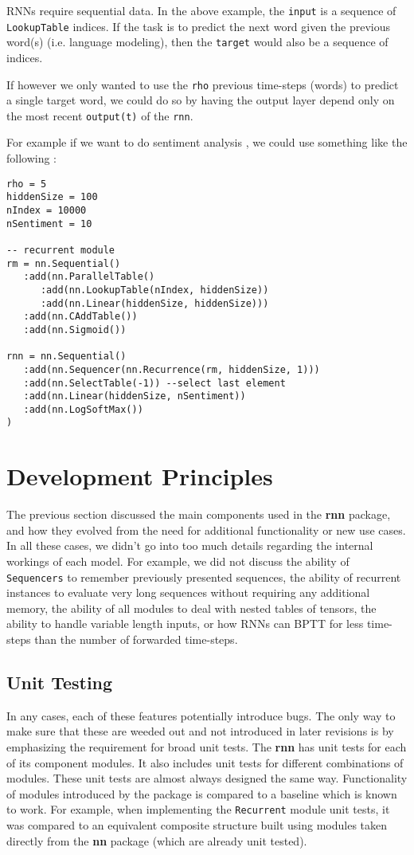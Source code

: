 \documentclass{article} %
\providecommand{\inlinecode}[1]{\texttt{#1}}
\begin{document}
RNNs require sequential data. In the above example, the \inlinecode{input} is a sequence 
of \inlinecode{LookupTable} indices. If the task is to predict the next word given 
the previous word(s) (i.e. language modeling), then the \inlinecode{target} would also be 
a sequence of indices.

If however we only wanted to use the \inlinecode{rho} previous time-steps (words) to predict 
a single target word, we could do so by having the output layer depend 
only on the most recent \inlinecode{output(t)} of the \inlinecode{rnn}. 

For example if we want to do sentiment analysis \cite{pang2008opinion}, 
we could use something like the following :

\begin{verbatim}
rho = 5
hiddenSize = 100
nIndex = 10000
nSentiment = 10

-- recurrent module
rm = nn.Sequential()
   :add(nn.ParallelTable()
      :add(nn.LookupTable(nIndex, hiddenSize))
      :add(nn.Linear(hiddenSize, hiddenSize)))
   :add(nn.CAddTable())
   :add(nn.Sigmoid())

rnn = nn.Sequential()
   :add(nn.Sequencer(nn.Recurrence(rm, hiddenSize, 1)))
   :add(nn.SelectTable(-1)) --select last element
   :add(nn.Linear(hiddenSize, nSentiment))
   :add(nn.LogSoftMax())
)
\end{verbatim}

\section{Development Principles}

The previous section discussed the main components used in the \textbf{rnn} package, and how they 
evolved from the need for additional functionality or new use cases.
In all these cases, we didn't go into too much details regarding the internal workings of 
each model. For example, we did not discuss the ability of \inlinecode{Sequencers}
to remember previously presented sequences, the ability of recurrent
instances to evaluate very long sequences without requiring any additional memory,
the ability of all modules to deal with nested tables of tensors, the ability to handle variable 
length inputs, or how RNNs can BPTT for less time-steps than the number of forwarded time-steps.

\subsection{Unit Testing}
In any cases, each of these features potentially introduce bugs. The only way to 
make sure that these are weeded out and not introduced in later revisions is by 
emphasizing the requirement for broad unit tests. The \textbf{rnn} has unit tests 
for each of its component modules. It also includes unit tests for different combinations 
of modules. These unit tests are almost always designed the same way. Functionality of 
modules introduced by the package is compared to a baseline which is known to work.
For example, when implementing the \inlinecode{Recurrent} module unit tests, it was 
compared to an equivalent composite structure built using modules taken directly from the \textbf{nn} package (which are already unit tested).
\end{document}
